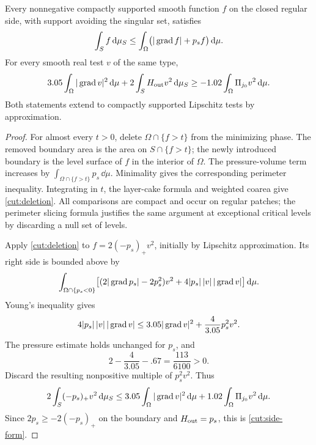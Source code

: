 \begin{lemma}\label{cut:side-estimate}
Every nonnegative compactly supported smooth function $f$ on the
closed regular side, with support avoiding the singular set, satisfies
\begin{equation}\label{cut:deletion}
       \int_S f\,\mathrm d\mu_S
       \le\int_\Omega\bigl(|\operatorname{grad} f|+p_sf\bigr)\,\mathrm d\mu.
\end{equation}
For every smooth real test $v$ of the same type,
\begin{equation}\label{cut:side-form}
 3.05\int_\Omega|\operatorname{grad} v|^2\,\mathrm d\mu
       +2\int_S H_{\rm out}v^2\,\mathrm d\mu_S
       \ge-1.02\int_\Omega\Pi_{j_0}v^2\,\mathrm d\mu.
\end{equation}
Both statements extend to compactly supported Lipschitz tests by
approximation.
\end{lemma}

\begin{proof}
For almost every $t>0$, delete $\Omega\cap\{f>t\}$ from the minimizing
phase.  The removed boundary area is the area on $S\cap\{f>t\}$;
the newly introduced boundary is the level surface of $f$ in the
interior of $\Omega$.  The pressure-volume term increases by
$\int_{\Omega\cap\{f>t\}}p_s\,\dd\mu$.  Minimality gives the
corresponding perimeter inequality.  Integrating in $t$, the layer-cake
formula and weighted coarea give \eqref{cut:deletion}.  All comparisons
are compact and occur on regular patches; the perimeter slicing formula
justifies the same argument at exceptional critical levels by discarding
a null set of levels.

Apply \eqref{cut:deletion} to $f=2(-p_s)_+v^2$, initially by Lipschitz
approximation.  Its right side is bounded above by
\[
 \int_{\Omega\cap\{p_s<0\}}
       \bigl[(2|\operatorname{grad} p_s|-2p_s^2)v^2
                         +4|p_s|\,|v|\,|\operatorname{grad} v|\bigr]\,\mathrm d\mu.
\]
Young's inequality gives
\[
 4|p_s|\,|v|\,|\operatorname{grad} v|
        \le3.05|\operatorname{grad} v|^2+\frac4{3.05}p_s^2v^2.
\]
The pressure estimate holds unchanged for $p_s$, and
\begin{equation}\label{cut:young-margin}
                2-\frac4{3.05}-.67=\frac{113}{6100}>0.
\end{equation}
Discard the resulting nonpositive multiple of $p_s^2v^2$.  Thus
\[
 2\int_S(-p_s)_+v^2\,\mathrm d\mu_S
 \le3.05\int_\Omega|\operatorname{grad} v|^2\,\mathrm d\mu
                  +1.02\int_\Omega\Pi_{j_0}v^2\,\mathrm d\mu.
\]
Since $2p_s\ge-2(-p_s)_+$ on the boundary and
$H_{\rm out}=p_s$, this is \eqref{cut:side-form}.
\end{proof}

